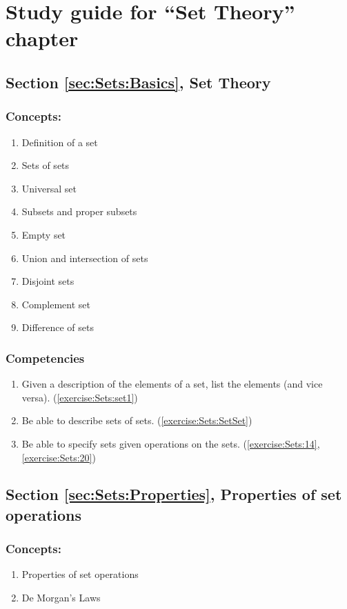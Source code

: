 \section{Study guide  for ``Set Theory''  chapter}
\label{sec:Sets:StudyGuide} 

\subsection*{Section \ref{sec:Sets:Basics}, Set Theory}
\subsubsection*{Concepts:}
\begin{enumerate}
\item 
Definition of a set
\item 
Sets of sets
\item 
Universal set
\item 
Subsets and proper subsets
\item 
Empty set
\item 
Union and intersection of sets
\item 
Disjoint sets
\item 
Complement set
\item 
Difference of sets
\end{enumerate}

\subsubsection*{Competencies}
\begin{enumerate}
\item
Given a description of the elements of a set, list the elements (and vice versa). (\ref{exercise:Sets:set1}) 
\item
Be able to describe sets of sets. (\ref{exercise:Sets:SetSet}) 
\item
Be able to specify sets given operations on the sets.  (\ref{exercise:Sets:14}, \ref{exercise:Sets:20})
\end{enumerate}


\subsection*{Section \ref{sec:Sets:Properties}, Properties of set operations}
\subsubsection*{Concepts:}
\begin{enumerate}
\item 
Properties of set operations
\item
De Morgan's Laws
\end{enumerate}

